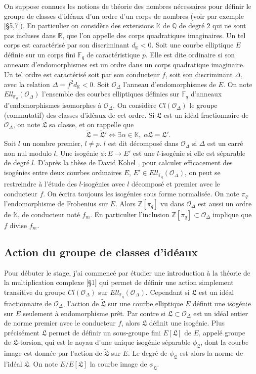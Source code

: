 \documentclass{article}
\newcommand{\Z}[0]{\mathbb{Z}}
\newcommand{\Q}[0]{\mathbb{Q}}
\newcommand{\R}[0]{\mathbb{R}}
\newcommand{\K}[0]{\mathbb{K}}
\newcommand{\OR}[0]{\mathcal{O}}
\newcommand{\LR}[0]{\mathfrak{L}}
\newcommand{\CL}[0]{\tilde{\LR}}
\newcommand{\F}[0]{\mathbb{F}}
\theoremstyle{definition}
\theoremstyle{remark}
\begin{document}
	On suppose connues les notions de théorie des nombres nécessaires pour définir le groupe de classes d'idéaux d'un ordre d'un corps de nombres (voir par exemple \cite{Cox}[\S 5,7]). En particulier on considère des extensions $\K$ de $\Q$ de degré $2$ qui ne sont pas incluses dans $\R$, que l'on appelle des corps quadratiques imaginaires. Un tel corps est caractérisé par son discriminant $d_\K < 0$. Soit une courbe elliptique $E$ définie sur un corps fini $\F_q$ de caractéristique $p$. Elle est dite ordinaire si son anneaux d'endomorphismes est un ordre dans un corps quadratique imaginaire. Un tel ordre est caractérisé soit par son conducteur $f$, soit son discriminant $\Delta$, avec la relation $\Delta = f^2d_\K < 0$. Soit $\OR_\Delta$ l'anneau d'endomorphismes de $E$. On note $Ell_{\F_q}(\OR_\Delta)$ l'ensemble des courbes elliptiques définies sur $\F_q$ d'anneaux d'endomorphismes isomorphes à $\OR_\Delta$. On considère $Cl(\OR_\Delta)$ le groupe (commutatif) des classes d'idéaux de cet ordre. Si $\LR$ est un idéal fractionnaire de $\OR_\Delta$, on note $\CL$ sa classe, et on rappelle que 
	\begin{equation*}
		\CL = \CL' \iff \exists\alpha\in\K,\; \alpha\LR = \LR'.
	\end{equation*}
	Soit $l$ un nombre premier, $l\neq p$. $l$ est dit décomposé dans $\OR_\Delta$ si $\Delta$ est un carré non nul modulo $l$. Une isogénie $\phi : E\rightarrow E'$ est une $l$-isogénie si elle est séparable de degré $l$. D'après la thèse de David Kohel \cite{Kohel}, pour calculer efficacement des isogénies entre deux courbes ordinaires $E$, $E'\in Ell_{\F_q}(\OR_\Delta)$, on peut se restreindre à l'étude des $l$-isogénies avec $l$ décomposé et premier avec le conducteur $f$. On écrira toujours les isogénies sous forme normalisée. On note $\pi_q$ l'endomorphisme de Frobenius sur $E$. Alors $\Z[\pi_q]$ vu dans $\OR_\Delta$ est aussi un ordre de $\K$, de conducteur noté $f_m$. En particulier l'inclusion $\Z[\pi_q]\subset\OR_\Delta$ implique que $f$ divise $f_m$. 
	
	
	\subsection{Action du groupe de classes d'idéaux}
	
	 Pour débuter le stage, j'ai commencé par étudier une introduction à la théorie de la multiplication complexe \cite{Sil94}[\S 1] qui permet de définir une action simplement transitive du groupe $Cl(\OR_\Delta)$ sur $Ell_{\F_q}(\OR_\Delta)$. Cependant si $\LR$ est un idéal fractionnaire de $\OR_\Delta$, l'action de $\CL$ sur une courbe elliptique $E$ définit une isogénie sur $E$ seulement à endomorphisme prêt. Par contre si $\LR\subset\OR_\Delta$ est un idéal entier de norme premier avec le conducteur $f$, alors $\LR$ définit une isogénie. Plus précisément $\LR$ permet de définir un sous-groupe fini $E[\LR]$ de $E$, appelé groupe de $\LR$-torsion, qui est le noyau d'une unique isogénie séparable $\phi_\LR$, dont la courbe image est donnée par l'action de $\CL$ sur $E$. Le degré de $\phi_\LR$ est alors la norme de l'idéal $\LR$. On note $E/E[\LR]$ la courbe image de $\phi_\LR$.
	
\end{document}

